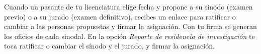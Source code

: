 \documentclass[11pt,a4paper]{article}
\begin{document}
{\small\tableofcontents}
\newpage
\begin{quevasahacer}
Cuando un pasante de tu licenciatura elige fecha y propone a su sínodo (examen previo) o a su jurado (examen definitivo), recibes un enlace para ratificar o cambiar a las personas propuestas y firmar la asignación. Con tu firma se generan los oficios de cada sinodal. En la opción \emph{Reporte de residencia de investigación} te toca ratificar o cambiar el sínodo y el jurado, y firmar la asignación.
\end{quevasahacer}



\end{document}
